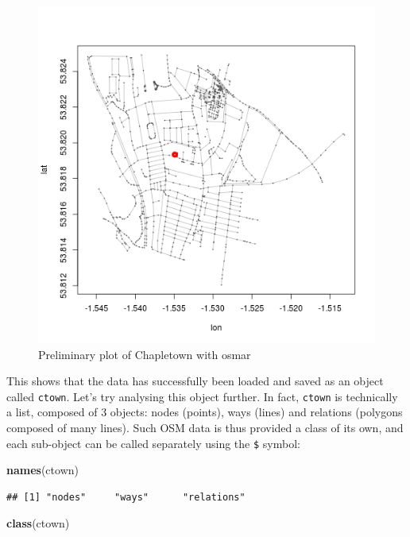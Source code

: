 \documentclass[]{article}
\newenvironment{Shaded}{}{}
\newcommand{\KeywordTok}[1]{\textcolor[rgb]{0.00,0.44,0.13}{\textbf{{#1}}}}
\newcommand{\NormalTok}[1]{{#1}}
\begin{document}
\begin{figure}[htbp]
\centering
\includegraphics{figure/Preliminary_plot_of_Chapletown_with_osmar.png}
\caption{Preliminary plot of Chapletown with osmar}
\end{figure}

This shows that the data has successfully been loaded and saved as an
object called \texttt{ctown}. Let's try analysing this object further.
In fact, \texttt{ctown} is technically a list, composed of 3 objects:
nodes (points), ways (lines) and relations (polygons composed of many
lines). Such OSM data is thus provided a class of its own, and each
sub-object can be called separately using the \texttt{\$} symbol:

\begin{Shaded}
\begin{Highlighting}[]
\KeywordTok{names}\NormalTok{(ctown)}
\end{Highlighting}
\end{Shaded}

\begin{verbatim}
## [1] "nodes"     "ways"      "relations"
\end{verbatim}

\begin{Shaded}
\begin{Highlighting}[]
\KeywordTok{class}\NormalTok{(ctown)}
\end{Highlighting}
\end{Shaded}
\end{document}
